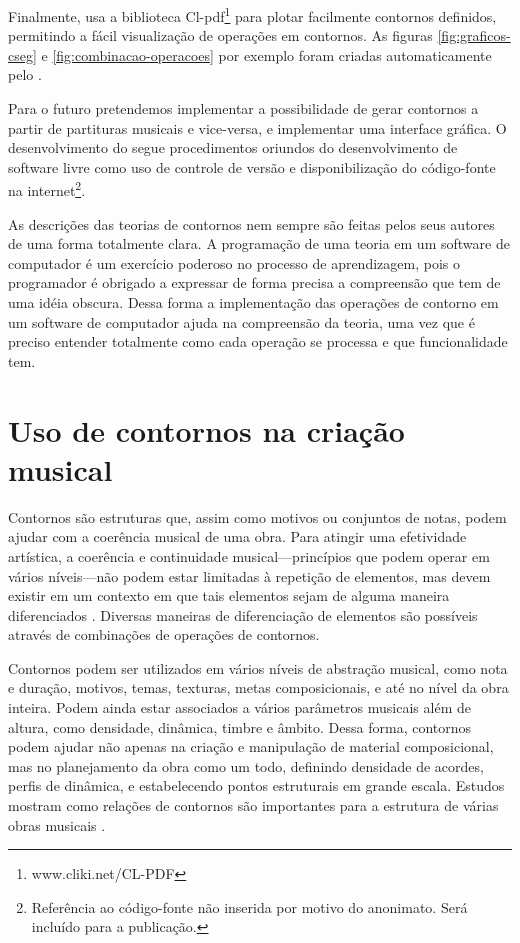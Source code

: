 Finalmente, \goiaba{} usa a biblioteca
Cl-pdf\footnote{www.cliki.net/CL-PDF} para plotar facilmente contornos
definidos, permitindo a fácil visualização de operações em
contornos. As figuras \ref{fig:graficos-cseg} e
\ref{fig:combinacao-operacoes} por exemplo foram criadas
automaticamente pelo \goiaba{}.

Para o futuro pretendemos implementar a possibilidade de gerar
contornos a partir de partituras musicais e vice-versa, e implementar
uma interface gráfica. O desenvolvimento do \goiaba{} segue
procedimentos oriundos do desenvolvimento de software livre como uso
de controle de versão e disponibilização do código-fonte na
internet\footnote{Referência ao código-fonte não inserida por motivo
  do anonimato. Será incluído para a publicação.}.

As descrições das teorias de contornos nem sempre são feitas pelos
seus autores de uma forma totalmente clara. A programação de uma
teoria em um software de computador é um exercício poderoso no
processo de aprendizagem, pois o programador é obrigado a expressar de
forma precisa a compreensão que tem de uma idéia obscura. Dessa forma
a implementação das operações de contorno em um software de computador
ajuda na compreensão da teoria, uma vez que é preciso entender
totalmente como cada operação se processa e que funcionalidade tem.

\section{Uso de contornos na criação musical}
\label{sec:uso-de-contornos}

Contornos são estruturas que, assim como motivos ou conjuntos de
notas, podem ajudar com a coerência musical de uma obra. Para atingir
uma efetividade artística, a coerência e continuidade
musical---princípios que podem operar em vários níveis---não podem
estar limitadas à repetição de elementos, mas devem existir em um
contexto em que tais elementos sejam de alguma maneira diferenciados
\cite[p. 296]{kliewer75:aspects}. Diversas maneiras de diferenciação
de elementos são possíveis através de combinações de operações de
contornos.

Contornos podem ser utilizados em vários níveis de abstração musical,
como nota e duração, motivos, temas, texturas, metas composicionais, e
até no nível da obra inteira. Podem ainda estar associados a vários
parâmetros musicais além de altura, como densidade, dinâmica, timbre e
âmbito. Dessa forma, contornos podem ajudar não apenas na criação e
manipulação de material composicional, mas no planejamento da obra
como um todo, definindo densidade de acordes, perfis de dinâmica, e
estabelecendo pontos estruturais em grande escala. Estudos mostram
como relações de contornos são importantes para a estrutura de várias
obras musicais
\cite{friedmann85:methodology,clifford95:contour,beard03:contour}.

